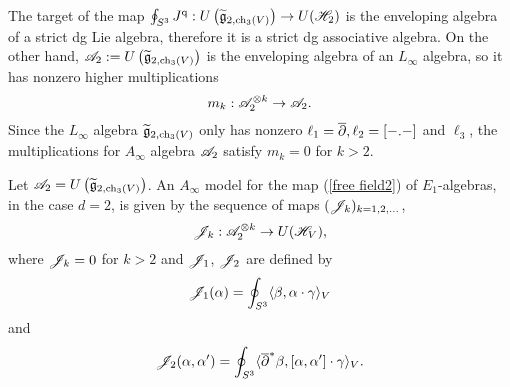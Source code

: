 The target of the map $\oint_{S^3} J^{\rm q} : U\left(\widetilde{\mathfrak g}_{2, {\rm ch}_3(V)}\right) \to U(\mathscr H_{2})$ is the enveloping algebra of a strict dg Lie algebra, therefore it is a strict dg associative algebra. 
On the other hand, $\mathscr A_2 := U\left(\widetilde{\mathfrak g}_{2, {\rm ch}_3(V)}\right)$ is the enveloping algebra of an $L_\infty$ algebra, so it has nonzero higher multiplications
\[
m_k : \mathscr A_2^{\otimes k} \to \mathscr A_2 .
\] 
Since the $L_\infty$ algebra $\widetilde{\mathfrak g}_{2, {\rm ch}_3(V)}$ only has nonzero $\ell_1 = \overline{\partial}, \ell_2 = [-.-]$ and $\ell_3$, the multiplications for $A_\infty$ algebra $\mathscr A_2$ satisfy $m_k = 0$ for $k > 2$. 

\begin{prop}\label{prop: ainfinty}
Let $\mathscr A_2 = U\left(\widetilde{\mathfrak g}_{2, {\rm ch}_3(V)}\right)$.
An $A_\infty$ model for the map (\ref{free field2}) of $E_1$-algebras, in the case $d=2$, is given by the sequence of maps $(\mathscr J_k)_{k = 1,2,\ldots}$,
\[
\mathscr J_k : \mathscr A_2^{\otimes k} \to U(\mathscr H_V),
\]
where $\mathscr J_k = 0$ for $k > 2$ and $\mathscr J_1$, $\mathscr J_2$ are defined by
\[
\mathscr J_1 (\alpha) = \oint_{S^3} \langle\beta, \alpha \cdot \gamma\rangle_V
\]
and 
\[
\mathscr J_2 (\alpha, \alpha') = \oint_{S^3} \langle\overline{\partial}^* \beta, [\alpha, \alpha'] \cdot \gamma\rangle_V .
\] 
\end{prop}

